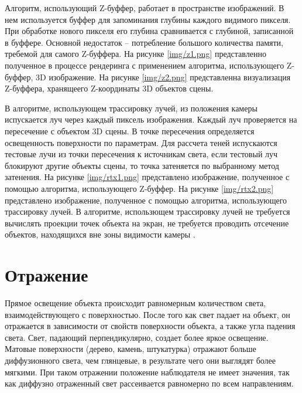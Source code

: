 Алгоритм, использующий Z-буффер, работает в пространстве изображений. В нем используется буффер для запоминания глубины каждого видимого пикселя. При обработке нового пикселя его глубина сравнивается с глубиной, записанной в буффере. Основной недостаток -- потребление большого количества памяти, требемой для самого Z-буффера. На рисунке \ref{img/z1.png} представленно полученное в процессе рендеринга с применением алгоритма, использующего Z-буффер, 3D изображение. На рисунке \ref{img/z2.png} представленна визуализация Z-буффера, хранящеего Z-координаты 3D объектов сцены. 



В алгоритме, использующем трассировку лучей, из положения камеры испускается луч через каждый пиксель изображения. Каждый луч проверяется на пересечение с объектом 3D сцены. В точке пересечения определяется освещенность поверхности по параметрам. Для рассчета теней испускаются тестовые лучи из точки пересечения к источникам света, если тестовый луч блокируют другие объекты сцены, то точка затеняется по выбранному метод затенения. На рисунке \ref{img/rtx1.png} представлено изображение, полученное с помощью алгоритма, использующего Z-буффер. На рисунке \ref{img/rtx2.png} представлено изображение, полученное с помощью алгоритма, использующего трассировку лучей. В алгоритме, использющем трассировку лучей не требуется вычислять проекции точек объекта на экран, не требуется проводить отсечение объектов, находящихся вне зоны видимости камеры \cite{gabriel}.



\section{Отражение}
Прямое освещение объекта происходит равномерным количеством света, взаимодействующего с поверхностью. После того как свет падает на объект, он отражается в зависимости от свойств поверхности объекта, а также угла падения света. Свет, падающий перпендикулярно, создает более яркое освещение. Матовые поверхности (дерево, камень, штукатурка) отражают больше диффузионного света, чем глянцевые, в результате чего они выглядят более мягкими.
При таком отражении положение наблюдателя не имеет значения, так как диффузно отраженный свет рассеивается равномерно по всем направлениям.

